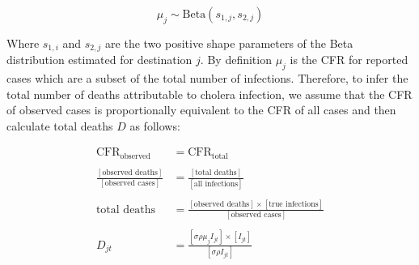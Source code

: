 \documentclass[
]{book}
\begin{document}
\[
\mu_j \sim \text{Beta}(s_{1,j}, s_{2,j})
\]

Where \(s_{1,i}\) and \(s_{2,j}\) are the two positive shape parameters of the Beta distribution estimated for destination \(j\). By definition \(\mu_j\) is the CFR for reported cases which are a subset of the total number of infections. Therefore, to infer the total number of deaths attributable to cholera infection, we assume that the CFR of observed cases is proportionally equivalent to the CFR of all cases and then calculate total deaths \(D\) as follows:

\begin{equation}
\begin{aligned}
\text{CFR}_{\text{observed}} &= \text{CFR}_{\text{total}}\\
\\[3pt]
\frac{[\text{observed deaths}]}{[\text{observed cases}]} &= 
\frac{[\text{total deaths}]}{[\text{all infections}]}\\
\\[3pt]
\text{total deaths} &= \frac{[\text{observed deaths}] \times [\text{true infections}]}{[\text{observed cases}]}\\
\\[3pt]
D_{jt} &= \frac{ [\sigma\rho\mu_j I_{jt}] \times [I_{jt}] }{ [\sigma\rho I_{jt}] }
\end{aligned}
\end{equation}
\end{document}
